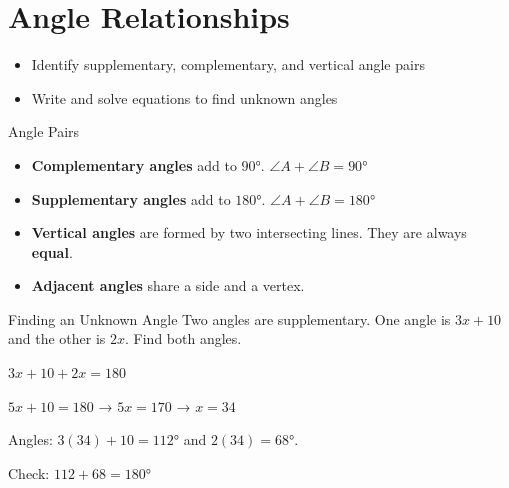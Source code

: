 \section{Angle Relationships}

\begin{learningGoals}
\begin{itemize}
    \item Identify supplementary, complementary, and vertical angle pairs
    \item Write and solve equations to find unknown angles
\end{itemize}
\end{learningGoals}

\begin{conceptBox}{Angle Pairs}
\begin{itemize}[leftmargin=*]
    \item \textbf{Complementary angles} add to $90°$. \quad $\angle A + \angle B = 90°$
    \item \textbf{Supplementary angles} add to $180°$. \quad $\angle A + \angle B = 180°$
    \item \textbf{Vertical angles} are formed by two intersecting lines. They are always \textbf{equal}.
    \item \textbf{Adjacent angles} share a side and a vertex.
\end{itemize}
\end{conceptBox}

\begin{workedExample}{Finding an Unknown Angle}
Two angles are supplementary. One angle is $3x + 10$ and the other is $2x$. Find both angles.

$3x + 10 + 2x = 180$

$5x + 10 = 180$ → $5x = 170$ → $x = 34$

Angles: $3(34) + 10 = 112°$ and $2(34) = 68°$.

Check: $112 + 68 = 180°$ \checkmark
{}
\end{workedExample}


